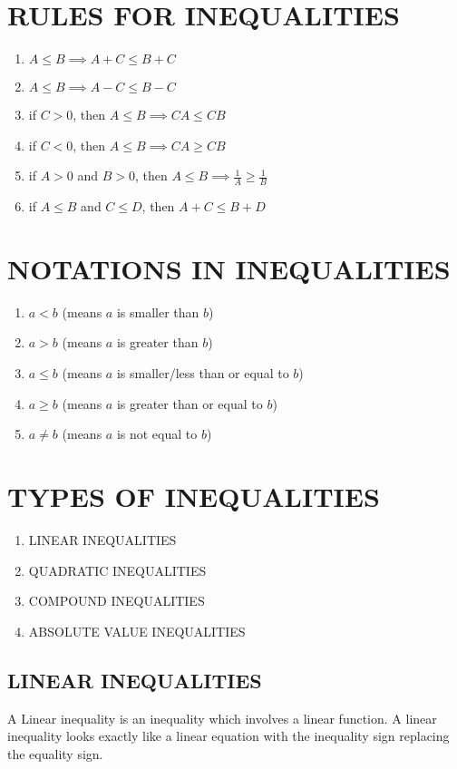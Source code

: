 \documentclass[12pt]{report}
\begin{document}
	\section{RULES FOR INEQUALITIES}
	\begin{enumerate}
		\item $A\leq B \implies A + C \leq B + C$
		\item $A \leq B \implies A - C \leq B - C$
		\item if $C > 0$, then $A \leq B \implies CA \leq CB$
		\item if $C < 0$, then $A \leq B \implies CA \geq CB$
		\item if $A > 0$ and $B > 0$, then $A \leq B \implies \frac{1}{A} \geq \frac{1}{B}$
		\item if $A \leq B$ and $C \leq D$, then $A + C \leq B + D$
	\end{enumerate}
	
	\section{NOTATIONS IN INEQUALITIES}
	\begin{enumerate}
		\item $a<b$ (means $a$ is smaller than $b$)
		\item $a>b$ (means $a$ is greater than $b$)
		\item $a \leq b$ (means $a$ is smaller/less than or equal to $b$)
		\item $a \geq b$ (means $a$ is greater than or equal to $b$)
		\item $a \neq b$ (means $a$ is not equal to $b$)
	\end{enumerate}
		
	\section{TYPES OF INEQUALITIES}
	\begin{enumerate}
		\item LINEAR INEQUALITIES
		\item QUADRATIC INEQUALITIES
		\item COMPOUND INEQUALITIES
		\item ABSOLUTE VALUE INEQUALITIES
	\end{enumerate}
		
	\subsection{LINEAR INEQUALITIES}
	A Linear inequality is an inequality which involves a linear function. A linear inequality looks exactly like a linear equation with the inequality sign replacing the equality sign.\\
		
\end{document}
